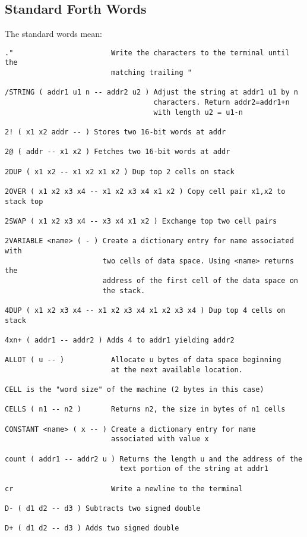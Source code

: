 \subsection{Standard Forth Words}
The standard words mean:
\begin{verbatim}
."                       Write the characters to the terminal until the
                         matching trailing "

/STRING ( addr1 u1 n -- addr2 u2 ) Adjust the string at addr1 u1 by n
                                   characters. Return addr2=addr1+n
                                   with length u2 = u1-n

2! ( x1 x2 addr -- ) Stores two 16-bit words at addr

2@ ( addr -- x1 x2 ) Fetches two 16-bit words at addr

2DUP ( x1 x2 -- x1 x2 x1 x2 ) Dup top 2 cells on stack

2OVER ( x1 x2 x3 x4 -- x1 x2 x3 x4 x1 x2 ) Copy cell pair x1,x2 to stack top

2SWAP ( x1 x2 x3 x4 -- x3 x4 x1 x2 ) Exchange top two cell pairs

2VARIABLE <name> ( - ) Create a dictionary entry for name associated with
                       two cells of data space. Using <name> returns the
                       address of the first cell of the data space on 
                       the stack.

4DUP ( x1 x2 x3 x4 -- x1 x2 x3 x4 x1 x2 x3 x4 ) Dup top 4 cells on stack

4xn+ ( addr1 -- addr2 ) Adds 4 to addr1 yielding addr2

ALLOT ( u -- )           Allocate u bytes of data space beginning 
                         at the next available location.

CELL is the "word size" of the machine (2 bytes in this case)

CELLS ( n1 -- n2 )       Returns n2, the size in bytes of n1 cells

CONSTANT <name> ( x -- ) Create a dictionary entry for name 
                         associated with value x

count ( addr1 -- addr2 u ) Returns the length u and the address of the
                           text portion of the string at addr1

cr                       Write a newline to the terminal

D- ( d1 d2 -- d3 ) Subtracts two signed double

D+ ( d1 d2 -- d3 ) Adds two signed double


\end{verbatim}
